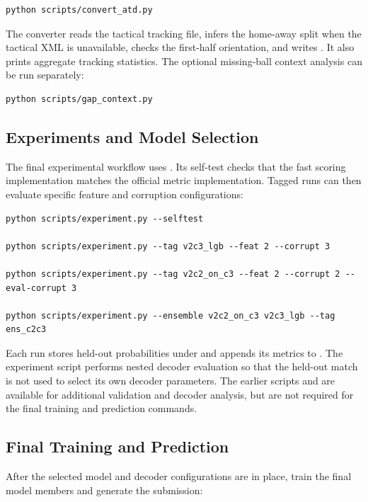 \documentclass[11pt,a4paper]{article}
\begin{document}
\begin{lstlisting}[style=terminal]
python scripts/convert_atd.py
\end{lstlisting}

The converter reads the tactical tracking file, infers the home-away split when the tactical XML is unavailable, checks the first-half orientation, and writes . It also prints aggregate tracking statistics. The optional missing-ball context analysis can be run separately:

\begin{lstlisting}[style=terminal]
python scripts/gap_context.py
\end{lstlisting}

\subsection{Experiments and Model Selection}

The final experimental workflow uses . Its self-test checks that the fast scoring implementation matches the official metric implementation. Tagged runs can then evaluate specific feature and corruption configurations:

\begin{lstlisting}[style=terminal]
python scripts/experiment.py --selftest

python scripts/experiment.py --tag v2c3_lgb --feat 2 --corrupt 3

python scripts/experiment.py --tag v2c2_on_c3 --feat 2 --corrupt 2 --eval-corrupt 3

python scripts/experiment.py --ensemble v2c2_on_c3 v2c3_lgb --tag ens_c2c3
\end{lstlisting}

Each run stores held-out probabilities under  and appends its metrics to . The experiment script performs nested decoder evaluation so that the held-out match is not used to select its own decoder parameters. The earlier scripts  and  are available for additional validation and decoder analysis, but are not required for the final training and prediction commands.

\subsection{Final Training and Prediction}

After the selected model and decoder configurations are in place, train the final model members and generate the submission:
\end{document}
